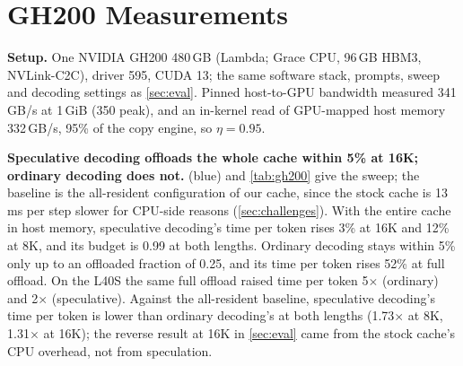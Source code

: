 \documentclass{article}
\begin{document}
\section{GH200 Measurements}
\label{sec:gh200}

\textbf{Setup.} One NVIDIA GH200 480\,GB (Lambda; Grace CPU, 96\,GB HBM3, NVLink-C2C), driver 595, CUDA 13; the same software stack, prompts, sweep and decoding settings as \cref{sec:eval}. Pinned host-to-GPU bandwidth measured 341\,GB/s at 1\,GiB (350 peak), and an in-kernel read of GPU-mapped host memory 332\,GB/s, 95\% of the copy engine, so $\eta = 0.95$.

\textbf{Speculative decoding offloads the whole cache within 5\% at 16K; ordinary decoding does not.}  (blue) and \cref{tab:gh200} give the sweep; the baseline is the all-resident configuration of our cache, since the stock cache is 13\,ms per step slower for CPU-side reasons (\cref{sec:challenges}). With the entire cache in host memory, speculative decoding's time per token rises 3\% at 16K and 12\% at 8K, and its budget is 0.99 at both lengths. Ordinary decoding stays within 5\% only up to an offloaded fraction of 0.25, and its time per token rises 52\% at full offload. On the L40S the same full offload raised time per token 5$\times$ (ordinary) and 2$\times$ (speculative). Against the all-resident baseline, speculative decoding's time per token is lower than ordinary decoding's at both lengths (1.73$\times$ at 8K, 1.31$\times$ at 16K); the reverse result at 16K in \cref{sec:eval} came from the stock cache's CPU overhead, not from speculation.
\end{document}
